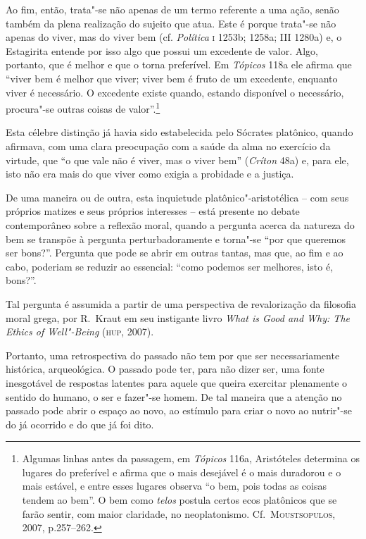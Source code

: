Ao fim, então, trata"-se não apenas de um termo referente a uma ação, senão 
também da plena realização do sujeito que atua. Este é porque trata"-se não
apenas do viver, mas do viver bem (cf. \textit{Política} \textsc{i} 1253b; 1258a; III 1280a)
e, o Estagirita entende por isso algo que possui um excedente de valor. 
Algo, portanto, que é melhor e que o torna preferível. Em \textit{Tópicos} 118a
ele afirma que ``viver bem é melhor que viver; viver bem é fruto de um
excedente, enquanto viver é necessário. O excedente existe quando, estando
disponível o necessário, procura"-se outras coisas de valor''.\footnote{
  Algumas linhas antes da passagem, em \textit{Tópicos} 116a, Aristóteles
  determina os lugares do preferível e afirma que o mais desejável é o mais
  duradorou e o mais estável, e entre esses lugares observa ``o bem, pois 
  todas as coisas tendem ao bem''. O bem como \textit{telos} postula certos ecos
  platônicos que se farão sentir, com maior claridade, no neoplatonismo.
  Cf.~\textsc{Moustsopulos}, 2007, p.257--262.}

Esta célebre distinção já havia sido estabelecida pelo Sócrates platônico, 
quando afirmava, com uma clara preocupação com a saúde da alma no exercício da
virtude, que ``o que vale não é viver, mas o viver bem'' (\textit{Críton} 48a)
e, para ele, isto não era mais do que viver como exigia a probidade e a justiça. 

De uma maneira ou de outra, esta inquietude platônico"-aristotélica -- com seus 
próprios matizes e seus próprios interesses -- está presente no debate
contemporâneo sobre a reflexão moral, quando a pergunta acerca da natureza do bem 
se transpõe à pergunta perturbadoramente e torna"-se ``por que queremos ser
bons?''. Pergunta que pode se abrir em outras tantas, mas que, ao fim e ao cabo,
poderiam se reduzir ao essencial: ``como podemos ser melhores, isto é, bons?''.

Tal pergunta é assumida a partir de uma perspectiva de revalorização da
filosofia moral grega, por R.~Kraut em seu instigante livro \textit{What is Good
and Why: The Ethics of Well"-Being} (\textsc{hup}, 2007). 

Portanto, uma retrospectiva do passado não tem por que ser necessariamente
histórica, arqueológica. O passado pode ter, para não dizer ser, uma fonte
inesgotável de respostas latentes para aquele que queira exercitar
plenamente o sentido do humano, o ser e fazer"-se homem. De tal maneira que a
atenção no passado pode abrir o espaço ao novo, ao estímulo para criar o novo 
ao nutrir"-se do já ocorrido e do que já foi dito. 

